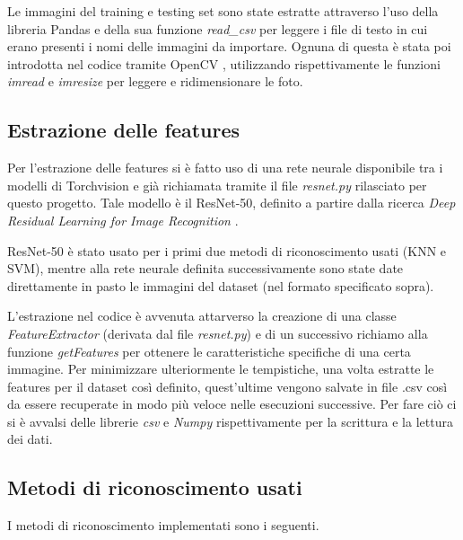 \documentclass[11pt, a4paper, titlepage]{article}
\begin{document}
\medskip
Le immagini del training e testing set sono state estratte attraverso l'uso della libreria Pandas \cite{pandas} e della sua funzione \emph{read\_csv} per leggere i file di testo in cui erano presenti i nomi delle immagini da importare. Ognuna di questa è stata poi introdotta nel codice tramite OpenCV \cite{opencv}, utilizzando rispettivamente le funzioni \emph{imread} e \emph{imresize} per leggere e ridimensionare le foto. 

\subsection{Estrazione delle features}
Per l'estrazione delle features si è fatto uso di una rete neurale disponibile tra i modelli di Torchvision e già richiamata tramite il file \emph{resnet.py} rilasciato per questo progetto. Tale modello è il ResNet-50, definito a partire dalla ricerca \emph{Deep Residual Learning for Image Recognition} \cite{resnet50}.

ResNet-50 è stato usato per i primi due metodi di riconoscimento usati (KNN e SVM), mentre alla rete neurale definita successivamente sono state date direttamente in pasto le immagini del dataset (nel formato specificato sopra).
 
\medskip
L'estrazione nel codice è avvenuta attarverso la creazione di una classe \emph{FeatureExtractor} (derivata dal file \emph{resnet.py}) e di un successivo richiamo alla funzione \emph{getFeatures} per ottenere le caratteristiche specifiche di una certa immagine.  
Per minimizzare ulteriormente le tempistiche, una volta estratte le features per il dataset così definito, quest'ultime vengono salvate in file .csv così da essere recuperate in modo più veloce nelle esecuzioni successive. Per fare ciò ci si è avvalsi delle librerie \emph{csv} e \emph{Numpy} \cite{numpy1}\cite{numpy2} rispettivamente per la scrittura e la lettura dei dati. 

\subsection{Metodi di riconoscimento usati}
I metodi di riconoscimento implementati sono i seguenti. 
\end{document}
